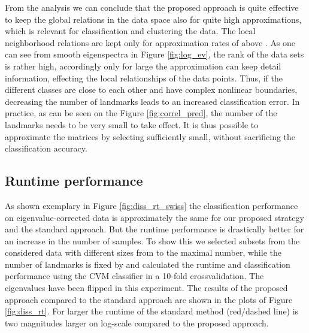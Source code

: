 \documentclass[twoside,11pt]{article}
\begin{document}
From the analysis we can conclude that the proposed approach is quite effective to keep the global relations in the data space
also for quite high approximations, which is relevant for classification and clustering the data. The local neighborhood relations 
are kept only for approximation rates of above . As one can see from smooth eigenspectra in Figure \ref{fig:log_ev}, the 
rank of the data sets is rather high, accordingly only for large  the approximation can keep detail information, effecting the
local relationships of the data points. Thus, if the different classes are close to each other
and have complex nonlinear boundaries,
decreasing the number of landmarks
leads to an increased classification error.
In practice, as can be seen on the Figure \ref{fig:correl_pred},
the number of the landmarks needs to be very small to take effect.
It is thus possible to approximate the matrices
by selecting  sufficiently small,
without sacrificing the classification accuracy.

\subsection{Runtime performance}
As shown exemplary in Figure \ref{fig:diss_rt_swiss} the classification performance on eigenvalue-cor\-rected data is approximately 
the same for our proposed strategy and the standard approach.
But the runtime performance is  drastically better for an 
increase in the number of samples.
To show this we selected subsets from the considered data with different sizes
from  to the maximal number, while the number of landmarks is fixed by  and calculated the runtime and classification
performance using the CVM classifier in a 10-fold crossvalidation. The eigenvalues have been flipped in this experiment.
The results of the proposed approach compared to the standard approach are shown in the plots of Figure \ref{fig:diss_rt}. 
For larger  the runtime of the standard method (red/dashed line) is two magnitudes larger on log-scale compared to the proposed approach.
\end{document}
